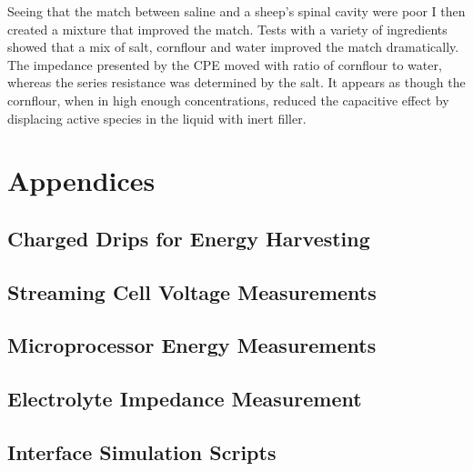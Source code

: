     Seeing that the match between saline and a sheep's spinal cavity were poor I then created a mixture that improved the match.
    Tests with a variety of ingredients showed that a mix of salt, cornflour and water improved the match dramatically.
    The impedance presented by the CPE moved with ratio of cornflour to water, whereas the series resistance was determined by the salt.
    It appears as though the cornflour, when in high enough concentrations, reduced the capacitive effect by displacing active species in the liquid with inert filler.



\part{Appendices}

  \appendix

  \chapter{Charged Drips for Energy Harvesting}
    \label{appendix:chargedDropletts}
    

  \chapter{Streaming Cell Voltage Measurements}
    \label{appendix:streamingCellMeasurements}
    

  \chapter{Microprocessor Energy Measurements}
    

  \chapter{Electrolyte Impedance Measurement}
    

  \chapter{Interface Simulation Scripts}
    

